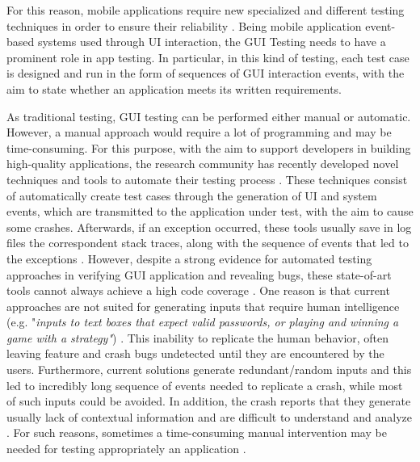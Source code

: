 For this reason, mobile applications require new specialized and different testing techniques in order to ensure their reliability \cite{muccini}. Being mobile application event-based systems used through UI interaction, the GUI Testing needs to have a prominent role in app testing. In particular, in this kind of testing, each test case is designed and run in the form of sequences of GUI interaction events, with the aim to state whether an application meets its written requirements. 

As traditional testing, GUI testing can be performed either manual or automatic. However, a manual approach would require a lot of programming and may be time-consuming. 
For this purpose, with the aim to support developers in building high-quality applications, the research community has recently developed novel techniques and tools to automate their testing process \cite{sapienz, dynodroid ,muccini,Hu:2011:AGT:1982595.1982612}. 
These techniques consist of automatically create test cases through the generation of UI and system events, which are transmitted to the application under test, with the aim to cause some crashes. Afterwards, if an exception occurred, these tools usually save in log files the correspondent stack traces, along with the sequence of events that led to the exceptions \cite{muccini}. 
However, despite a strong evidence for automated testing approaches in verifying GUI application and revealing bugs, these state-of-art tools cannot always achieve a high code coverage \cite{Nagappan2015}. 
One reason is that current approaches are not suited for generating inputs that require human intelligence (e.g. "\textit{inputs to text boxes that expect valid passwords, or playing and winning a game with a strategy"}) \cite{dynodroid}. This inability to replicate the human behavior, often leaving feature and crash bugs undetected until they are encountered by the users.
Furthermore, current solutions generate redundant/random inputs and this led to incredibly long sequence of events needed to replicate a crash, while most of such inputs could be avoided. In addition, the crash reports that they generate usually lack of contextual information and are difficult to understand and analyze \cite{Chen, Joorabchi}. 
For such reasons, sometimes a time-consuming manual intervention may be needed for testing appropriately an application \cite{Nagappan2015}. 

